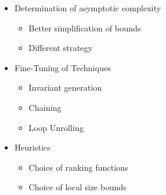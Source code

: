 \begin{itemize}[<+->]
\item Determination of asymptotic complexity
  \begin{itemize}
    \item Better simplification of bounds
    \item Different strategy 
  \end{itemize}
\item Fine-Tuning of Techniques
  \begin{itemize}
  \item Invariant generation
  \item Chaining
  \item Loop Unrolling
  \end{itemize}
\item Heuristics
  \begin{itemize}
  \item Choice of ranking functions
  \item Choice of local size bounds
  \end{itemize}
\end{itemize}
